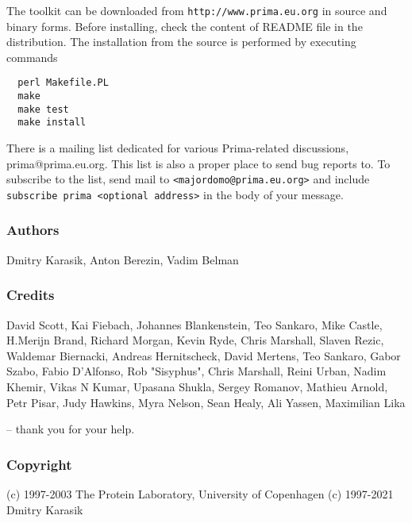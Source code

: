 \documentclass{report}
\begin{document}
The toolkit can be downloaded from \texttt{http://www.prima.eu.org} in
source and binary forms. Before installing, check the content of README file
in the distribution. The installation from the source is performed by
executing commands
\begin{verbatim}
  perl Makefile.PL
  make
  make test
  make install
\end{verbatim}

There is a mailing list dedicated for various Prima-related discussions,
prima@prima.eu.org. This list is also a proper place to send bug reports to.
To subscribe to the list, send mail to \texttt{<majordomo@prima.eu.org>} and
include \texttt{subscribe prima <optional address>} in the body of your message.

\subsubsection{Authors}

Dmitry Karasik,
Anton Berezin,
Vadim Belman

\subsubsection{Credits}

David Scott,
Kai Fiebach,
Johannes Blankenstein,
Teo Sankaro,
Mike Castle,
H.Merijn Brand,
Richard Morgan,
Kevin Ryde,
Chris Marshall,
Slaven Rezic,
Waldemar Biernacki,
Andreas Hernitscheck,
David Mertens,
Teo Sankaro,
Gabor Szabo,
Fabio D'Alfonso,
Rob "Sisyphus",
Chris Marshall,
Reini Urban,
Nadim Khemir,
Vikas N Kumar,
Upasana Shukla,
Sergey Romanov,
Mathieu Arnold,
Petr Pisar,
Judy Hawkins,
Myra Nelson,
Sean Healy,
Ali Yassen,
Maximilian Lika

-- thank you for your help.

\subsubsection{Copyright}

(c) 1997-2003 The Protein Laboratory, University of Copenhagen
(c) 1997-2021 Dmitry Karasik
\end{document}
